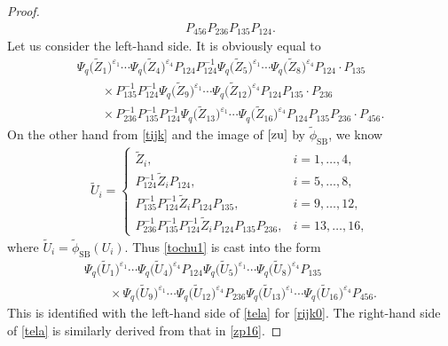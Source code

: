 \begin{proof}
\begin{gather}
P_{456}P_{236}P_{135}P_{124}.\label{zp16}
\end{gather}
Let us consider the left-hand side.
It is obviously equal to
\begin{gather}
\Psi_q\bigl(\tilde{Z}_1\bigr)^{\varepsilon_1}\dotsm \Psi_q\bigl({\tilde Z}_{4}\bigr)^{\varepsilon_4}
P_{124}
P^{-1}_{124}
\Psi_q\bigl(\tilde{Z}_5\bigr)^{\varepsilon_1}\dotsm \Psi_q\bigl({\tilde Z}_{8}\bigr)^{\varepsilon_4}
P_{124} \cdot P_{135}\nonumber
\\
\qquad \times
P^{-1}_{135} P^{-1}_{124}
\Psi_q\bigl(\tilde{Z}_9\bigr)^{\varepsilon_1}\dotsm \Psi_q\bigl({\tilde Z}_{12}\bigr)^{\varepsilon_4}
P_{124} P_{135} \cdot P_{236}\nonumber
\\
\qquad \times
P^{-1}_{236} P^{-1}_{135} P^{-1}_{124}
\Psi_q\bigl(\tilde{Z}_{13}\bigr)^{\varepsilon_1}\dotsm \Psi_q\bigl({\tilde Z}_{16}\bigr)^{\varepsilon_4}
P_{124} P_{135} P_{236} \cdot P_{456}.\label{tochu1}
\end{gather}
On the other hand from \eqref{tijk} and the image of $\eqref{zu}$ by $\tilde{\phi}_\mathrm{SB}$, we know
\begin{align*}
{\tilde U}_i = \begin{cases}
\tilde{Z}_i, & i=1,\dotsc, 4,
\\
P_{124}^{-1} \tilde{Z}_i P_{124}, & i=5,\dotsc, 8,
\\
P_{135}^{-1}P_{124}^{-1} \tilde{Z}_i P_{124}P_{135}, & i=9,\dotsc, 12,
\\
P_{236}^{-1}P_{135}^{-1}P_{124}^{-1} \tilde{Z}_i
P_{124}P_{135} P_{236}, & i=13,\dotsc, 16,
\end{cases}
\end{align*}
where $\tilde{U}_i = \tilde{\phi}_\mathrm{SB}(U_i)$.
Thus \eqref{tochu1} is cast into the form
\begin{gather*}
\Psi_q\bigl(\tilde{U}_1\bigr)^{\varepsilon_1}\cdots \Psi_q\bigl({\tilde U}_{4}\bigr)^{\varepsilon_4}
P_{124}
\Psi_q\bigl(\tilde{U}_5\bigr)^{\varepsilon_1}\cdots \Psi_q\bigl({\tilde U}_{8}\bigr)^{\varepsilon_4}
P_{135}
\\
\qquad\times
\Psi_q\bigl(\tilde{U}_9\bigr)^{\varepsilon_1}\cdots \Psi_q\bigl({\tilde U}_{12}\bigr)^{\varepsilon_4}
P_{236}
\Psi_q\bigl(\tilde{U}_{13}\bigr)^{\varepsilon_1}\cdots \Psi_q\bigl({\tilde U}_{16}\bigr)^{\varepsilon_4}
P_{456}.
\end{gather*}
This is identified with the left-hand side of \eqref{tela} for \eqref{rijk0}.
The right-hand side of \eqref{tela} is similarly derived from that in \eqref{zp16}.
\end{proof}
